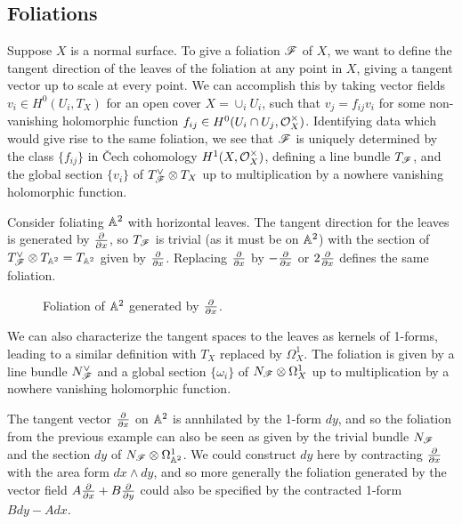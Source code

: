 

\subsection{Foliations}

Suppose $X$ is a normal surface. To give a foliation $\mathscr{F}$ of $X$, we want to
define the tangent direction of the leaves of the foliation at any point in $X$,
giving a tangent vector up to scale at every point. We can accomplish this by
taking vector fields $v_i\in H^0(U_i,T_X)$ for an open cover $X=\cup_iU_i$, such
that $v_j=f_{ij}v_i$ for some non-vanishing holomorphic function
$f_{ij}\in H^0(U_i\cap U_j,\mathcal{O}_X^\times)$. Identifying data which would give rise
to the same foliation, we see that $\mathscr{F}$ is uniquely determined by the class
$\{f_{ij}\}$ in \v{C}ech cohomology $H^1(X,\mathcal{O}_X^\times)$, defining a line bundle
$T_{\mathscr{F}}$, and the global section $\{v_i\}$ of $T_{\mathscr{F}}^\vee\otimes T_X$ up to
multiplication by a nowhere vanishing holomorphic function.

\begin{example}
    Consider foliating $\mathbb{A}^2$ with horizontal leaves. The tangent direction for
    the leaves is generated by $\pdv{}{x}$, so $T_{\mathscr{F}}$ is trivial (as it must
    be on $\mathbb{A}^2$) with the section of $T_{\mathscr{F}}^\vee\otimes T_{\mathbb{A}^2}=T_{\mathbb{A}^2}$ given
    by $\pdv{}{x}$. Replacing $\pdv{}{x}$ by $-\pdv{}{x}$ or $2\pdv{}{x}$
    defines the same foliation.
    \begin{figure}[H]
        \centering
        \caption{Foliation of $\mathbb{A}^2$ generated by $\pdv{}{x}$.}
    \end{figure}
\end{example}

We can also characterize the tangent spaces to the leaves as kernels of 1-forms,
leading to a similar definition with $T_X$ replaced by $\Omega^1_X$. The
foliation is given by a line bundle $N_{\mathscr{F}}^\vee$ and a global section
$\{\omega_i\}$ of $N_{\mathscr{F}}\otimes\Omega^1_X$ up to multiplication by a nowhere
vanishing holomorphic function.

\begin{example}
    The tangent vector $\pdv{}{x}$ on $\mathbb{A}^2$ is annhilated by the 1-form $dy$,
    and so the foliation from the previous example can also be seen as given by
    the trivial bundle $N_{\mathscr{F}}$ and the section $dy$ of
    $N_{\mathscr{F}}\otimes\Omega^1_{\mathbb{A}^2}$. We could construct $dy$ here by contracting
    $\pdv{}{x}$ with the area form $dx\wedge dy$, and so more generally the
    foliation generated by the vector field $A\pdv{}{x}+B\pdv{}{y}$ could also
    be specified by the contracted 1-form $Bdy-Adx$.
\end{example}

